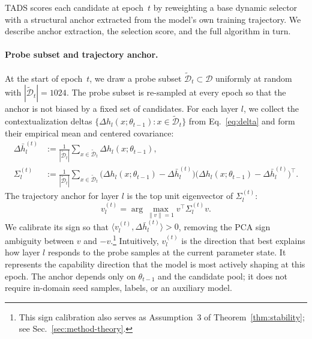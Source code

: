 \textsc{TADS} scores each candidate at epoch~$t$ by reweighting a
base dynamic selector with a structural anchor extracted from the
model's own training trajectory. We describe anchor extraction, the
selection score, and the full algorithm in turn.

\paragraph{Probe subset and trajectory anchor.}
At the start of epoch~$t$, we draw a probe subset
$\widetilde{\mathcal{D}}_t \subset \mathcal{D}$ uniformly at random
with $|\widetilde{\mathcal{D}}_t| = 1024$. The probe subset is
re-sampled at every epoch so that the anchor is not biased by a
fixed set of candidates. For each layer $l$, we collect the
contextualization deltas
$\{\Delta h_l(x;\theta_{t-1}) : x \in \widetilde{\mathcal{D}}_t\}$
from Eq.~\ref{eq:delta} and form their empirical mean and centered
covariance:
\begin{align}
  \Delta \bar{h}_l^{(t)}
   &:=
   \frac{1}{|\widetilde{\mathcal{D}}_t|}
   \sum_{x \in \widetilde{\mathcal{D}}_t}
   \Delta h_l(x;\theta_{t-1}),
   \label{eq:mu} \\[2pt]
  \Sigma_l^{(t)}
   &:=
   \frac{1}{|\widetilde{\mathcal{D}}_t|}
   \sum_{x \in \widetilde{\mathcal{D}}_t}
   \bigl(\Delta h_l(x;\theta_{t-1}) - \Delta \bar{h}_l^{(t)}\bigr)
   \bigl(\Delta h_l(x;\theta_{t-1}) - \Delta \bar{h}_l^{(t)}\bigr)^{\!\top}.
   \label{eq:sigma}
\end{align}
The trajectory anchor for layer $l$ is the top unit eigenvector of
$\Sigma_l^{(t)}$:
\begin{equation}
  v_l^{(t)}
  =
  \arg\max_{\|v\| = 1}
  v^{\!\top}\Sigma_l^{(t)}v .
  \label{eq:anchor-def}
\end{equation}
We calibrate its sign so that
$\langle v_l^{(t)}, \Delta \bar{h}_l^{(t)} \rangle > 0$, removing
the PCA sign ambiguity between $v$ and $-v$.\footnote{This sign
calibration also serves as Assumption~3 of
Theorem~\ref{thm:stability}; see Sec.~\ref{sec:method-theory}.}
Intuitively, $v_l^{(t)}$ is the direction that best explains how
layer $l$ responds to the probe samples at the current parameter
state. It represents the capability direction that the model is most
actively shaping at this epoch. The anchor depends only on
$\theta_{t-1}$ and the candidate pool; it does not require
in-domain seed samples, labels, or an auxiliary model.


